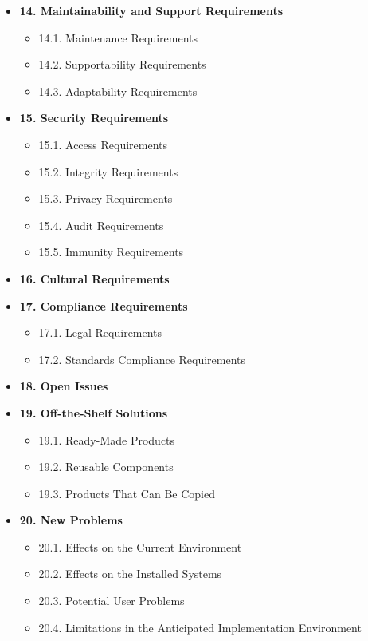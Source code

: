 \documentclass[12pt, titlepage]{article}
\begin{document}
\begin{itemize}
    \item \textbf{14. Maintainability and Support Requirements}
    \begin{itemize}
        \item 14.1. Maintenance Requirements
        \item 14.2. Supportability Requirements
        \item 14.3. Adaptability Requirements
    \end{itemize}
    \item \textbf{15. Security Requirements}
    \begin{itemize}
        \item 15.1. Access Requirements
        \item 15.2. Integrity Requirements
        \item 15.3. Privacy Requirements
        \item 15.4. Audit Requirements
        \item 15.5. Immunity Requirements
    \end{itemize}
    \item \textbf{16. Cultural Requirements}
    \item \textbf{17. Compliance Requirements}
    \begin{itemize}
        \item 17.1. Legal Requirements
        \item 17.2. Standards Compliance Requirements
    \end{itemize}
    \item \textbf{18. Open Issues}
    \item \textbf{19. Off-the-Shelf Solutions}
    \begin{itemize}
        \item 19.1. Ready-Made Products
        \item 19.2. Reusable Components
        \item 19.3. Products That Can Be Copied
    \end{itemize}
    \item \textbf{20. New Problems}
    \begin{itemize}
        \item 20.1. Effects on the Current Environment
        \item 20.2. Effects on the Installed Systems
        \item 20.3. Potential User Problems
        \item 20.4. Limitations in the Anticipated Implementation Environment

\end{itemize}
\end{itemize}
\end{document}
